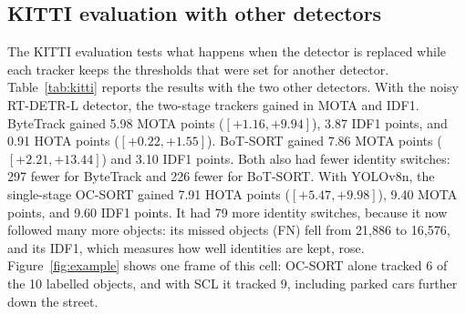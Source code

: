 \documentclass[pdflatex,sn-mathphys-num,iicol]{sn-jnl}
\newcommand{\scl}{SCL}
\begin{document}
\subsection{KITTI evaluation with other detectors}\label{sec:detector}
The KITTI evaluation tests what happens when the detector is replaced while each tracker keeps the
thresholds that were set for another detector. Table~\ref{tab:kitti} reports the results with the
two other detectors. With the noisy RT-DETR-L detector, the two-stage trackers gained in MOTA and
IDF1. ByteTrack gained 5.98 MOTA points ($[+1.16,+9.94]$), 3.87 IDF1 points, and 0.91 HOTA points
($[+0.22,+1.55]$). BoT-SORT gained 7.86 MOTA points ($[+2.21,+13.44]$) and 3.10 IDF1 points. Both
also had fewer identity switches: 297 fewer for ByteTrack and 226 fewer for BoT-SORT. With YOLOv8n,
the single-stage OC-SORT gained 7.91 HOTA points ($[+5.47,+9.98]$), 9.40 MOTA points, and 9.60 IDF1
points. It had 79 more identity switches, because it now followed many more objects: its missed
objects (FN) fell from 21,886 to 16,576, and its IDF1, which measures how well identities are kept,
rose. Figure~\ref{fig:example} shows one frame of this cell: OC-SORT alone tracked 6 of the 10
labelled objects, and with \scl{} it tracked 9, including parked cars further down the street.
\end{document}
